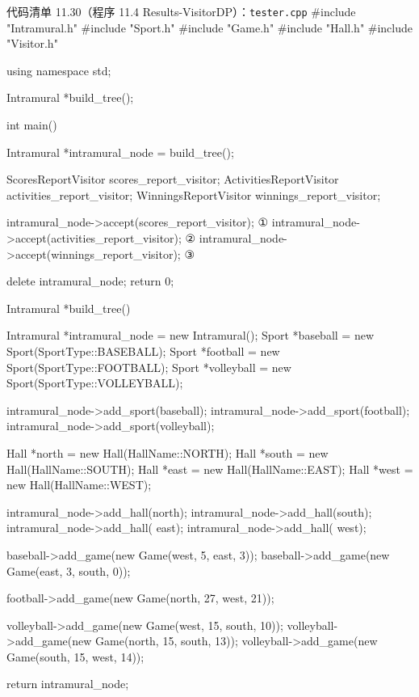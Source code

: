 \begin{codeboxt}{代码清单 11.30（程序 11.4 Results-VisitorDP）：\texttt{tester.\allowbreak{}cpp}}
#include "Intramural.h"
#include "Sport.h"
#include "Game.h"
#include "Hall.h"
#include "Visitor.h"
 
using namespace std;
 
Intramural *build_tree();
 
int main()
{
    Intramural *intramural_node = build_tree();
 
    ScoresReportVisitor     scores_report_visitor;
    ActivitiesReportVisitor activities_report_visitor;
    WinningsReportVisitor   winnings_report_visitor;
 
    intramural_node->accept(scores_report_visitor);        ①
    intramural_node->accept(activities_report_visitor);    ②
    intramural_node->accept(winnings_report_visitor);      ③
 
    delete intramural_node;
    return 0;
}
 
Intramural *build_tree()
{
    Intramural *intramural_node = new Intramural();
    Sport *baseball   = new Sport(SportType::BASEBALL);
    Sport *football   = new Sport(SportType::FOOTBALL);
    Sport *volleyball = new Sport(SportType::VOLLEYBALL);
 
    intramural_node->add_sport(baseball);
    intramural_node->add_sport(football);
    intramural_node->add_sport(volleyball);
 
    Hall *north = new Hall(HallName::NORTH);
    Hall *south = new Hall(HallName::SOUTH);
    Hall *east  = new Hall(HallName::EAST);
    Hall *west  = new Hall(HallName::WEST);
 
    intramural_node->add_hall(north);
    intramural_node->add_hall(south);
    intramural_node->add_hall(  east);
    intramural_node->add_hall( west);
 
    baseball->add_game(new Game(west, 5, east,  3));
    baseball->add_game(new Game(east, 3, south, 0));
 
    football->add_game(new Game(north, 27, west, 21));
 
    volleyball->add_game(new Game(west,  15, south, 10));
    volleyball->add_game(new Game(north, 15, south, 13));
    volleyball->add_game(new Game(south, 15, west,  14));
 
    return intramural_node;
}
\end{codeboxt}
\par
{}\par
{}\par

